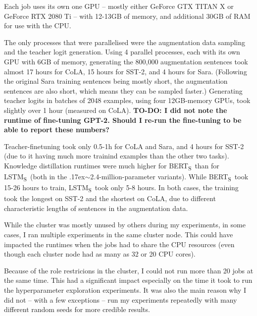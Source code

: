 \documentclass[bsc,frontabs,twoside,singlespacing,parskip,deptreport]{infthesis}
\def\mytilde{{\raise.17ex\hbox{$\scriptstyle\sim$}}}
\def\BERTS{BERT\textsubscript{S}}
\def\LSTMS{LSTM\textsubscript{S}}
\begin{document}
{{    Each job uses its own one GPU -- mostly either GeForce GTX TITAN X or GeForce RTX 2080 Ti -- with 12-13GB of memory, and additional 30GB of RAM for use with the CPU.

    The only processes that were parallelised were the augmentation data sampling and the teacher logit generation. Using 4 parallel processes, each with its own GPU with 6GB of memory, generating the 800,000 augmentation sentences took almost 17 hours for CoLA, 15 hours for SST-2, and 4 hours for Sara. (Following the original Sara training sentences being mostly short, the augmentation sentences are also short, which means they can be sampled faster.) Generating teacher logits in batches of 2048 examples, using four 12GB-memory GPUs, took slightly over 1 hour (measured on CoLA).
    \textbf{TO-DO: I did not note the runtime of fine-tuning GPT-2. Should I re-run the fine-tuning to be able to report these numbers?}

    Teacher-finetuning took only 0.5-1h for CoLA and Sara, and 4 hours for SST-2 (due to it having much more trainind examples than the other two tasks). Knowledge distillation runtimes were much higher for \BERTS~than for \LSTMS~(both in the \mytilde2.4-million-parameter variants). While \BERTS~took 15-26 hours to train, \LSTMS~took only 5-8 hours. In both cases, the training took the longest on SST-2 and the shortest on CoLA, due to different characteristic lengths of sentences in the augmentation data.

    While the cluster was mostly unused by others during my experiments, in some cases, I ran multiple experiments in the same cluster node. This could have impacted the runtimes when the jobs had to share the CPU resources (even though each cluster node had as many as 32 or 20 CPU cores).

    Because of the role restricions in the cluster, I could not run more than 20 jobs at the same time. This had a significant impact especially on the time it took to run the hyperparameter exploration experiments. It was also the main reason why I did not -- with a few exceptions -- run my experiments repeatedly with many different random seeds for more credible results. 
  }
}
\end{document}
